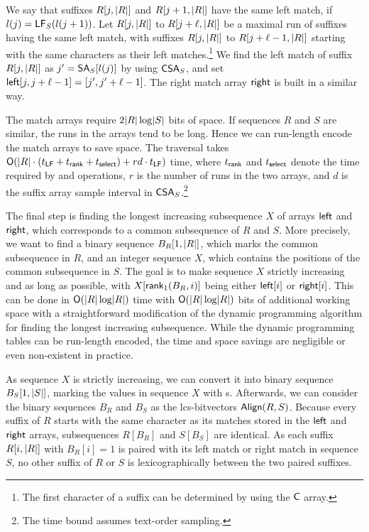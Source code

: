 We say that suffixes $R[j,\lvert R \rvert]$ and $R[j+1,\lvert R \rvert]$ have the same left
match, if $l(j) = \mathsf{LF}_{S}(l(j+1))$. Let $R[j,\lvert R \rvert]$ to $R[j+\ell,\lvert R \rvert]$
be a maximal run of suffixes having the same left match, with suffixes
$R[j,\lvert R \rvert]$ to $R[j+\ell-1,\lvert R \rvert]$ starting with the same characters as
their left matches.\footnote{The first character of a suffix can be determined
by using the $\mathsf{C}$ array.} We find the left match of suffix $R[j,\lvert R \rvert]$ as
$j' = \mathsf{SA}_{S}[l(j)]$ by using $\mathsf{CSA}_{S}$, and set $\mathsf{left}[j,j+\ell-1] =
[j',j'+\ell-1]$. The right match array $\mathsf{right}$ is built in a similar way.

The match arrays require $2\lvert R \rvert \log \lvert S \rvert$ bits of space. If sequences
$R$ and $S$ are similar, the runs in the arrays tend to be long. Hence we can
run-length encode the match arrays to save space. The traversal takes
$\mathsf{O}(\lvert R \rvert \cdot (t_{\mathsf{LF}} + t_{\mathsf{rank}} + t_{\mathsf{select}}) + rd \cdot
t_{\mathsf{LF}})$ time, where $t_{\mathsf{rank}}$ and $t_{\mathsf{select}}$ denote the time
required by \rank{} and \select{} operations, $r$ is the number of runs in the
two arrays, and $d$ is the suffix array sample interval in
$\mathsf{CSA}_{S}$.\footnote{The time bound assumes text-order sampling.}

The final step is finding the longest increasing subsequence $X$ of arrays
$\mathsf{left}$ and $\mathsf{right}$, which corresponds to a common subsequence of $R$ and
$S$. More precisely, we want to find a binary sequence $B_{R}[1,\lvert R \rvert]$,
which marks the common subsequence in $R$, and an integer sequence $X$, which
contains the positions of the common subsequence in $S$. The goal is to make
sequence $X$ strictly increasing and as long as possible, with
$X[\mathsf{rank}_{1}(B_{R}, i)]$ being either $\mathsf{left}[i]$ or $\mathsf{right}[i]$. This can
be done in $\mathsf{O}(\lvert R \rvert \log \lvert R \rvert)$ time with $\mathsf{O}(\lvert R \rvert \log \lvert R \rvert)$
bits of additional working space with a straightforward modification of the
dynamic programming algorithm for finding the longest increasing subsequence.
While the dynamic programming tables can be run-length encoded, the time and
space savings are negligible or even non-existent in practice.

As sequence $X$ is strictly increasing, we can convert it into binary sequence
$B_{S}[1,\lvert S \rvert]$, marking the values in sequence $X$ with \onebit{}s.
Afterwards, we can consider the binary sequences $B_{R}$ and $B_{S}$ as the
lcs-bitvectors $\mathsf{Align}(R,S)$. Because every suffix of $R$ starts with the same
character as its matches stored in the $\mathsf{left}$ and $\mathsf{right}$ arrays,
subsequences $R[B_{R}]$ and $S[B_{S}]$ are identical. As each suffix
$R[i,\lvert R \rvert]$ with $B_{R}[i] = 1$ is paired with its left match or right
match in sequence $S$, no other suffix of $R$ or $S$ is lexicographically
between the two paired suffixes.

